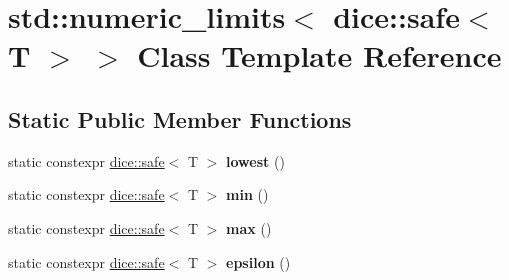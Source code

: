 \hypertarget{classstd_1_1numeric__limits_3_01dice_1_1safe_3_01T_01_4_01_4}{}\section{std\+:\+:numeric\+\_\+limits$<$ dice\+:\+:safe$<$ T $>$ $>$ Class Template Reference}
\label{classstd_1_1numeric__limits_3_01dice_1_1safe_3_01T_01_4_01_4}
\subsection*{Static Public Member Functions}
\begin{DoxyCompactItemize}
\item 
\mbox{\label{classstd_1_1numeric__limits_3_01dice_1_1safe_3_01T_01_4_01_4_a97cfb8c3de73ffd4df9b5220e8b9475c}} 
static constexpr \mbox{\hyperlink{safe_8hpp_acd796e346e2b746739435c4a2983edba}{dice\+::safe}}$<$ T $>$ {\bfseries lowest} ()
\item 
\mbox{\label{classstd_1_1numeric__limits_3_01dice_1_1safe_3_01T_01_4_01_4_a6e2df63214d969fe081684f30e853906}} 
static constexpr \mbox{\hyperlink{safe_8hpp_acd796e346e2b746739435c4a2983edba}{dice\+::safe}}$<$ T $>$ {\bfseries min} ()
\item 
\mbox{\label{classstd_1_1numeric__limits_3_01dice_1_1safe_3_01T_01_4_01_4_a7aa0e628742910d99c2638068b24d194}} 
static constexpr \mbox{\hyperlink{safe_8hpp_acd796e346e2b746739435c4a2983edba}{dice\+::safe}}$<$ T $>$ {\bfseries max} ()
\item 
\mbox{\label{classstd_1_1numeric__limits_3_01dice_1_1safe_3_01T_01_4_01_4_a9813a0ef58e72d30557426f38e3686e7}} 
static constexpr \mbox{\hyperlink{safe_8hpp_acd796e346e2b746739435c4a2983edba}{dice\+::safe}}$<$ T $>$ {\bfseries epsilon} ()
\item 
\mbox{\label{classstd_1_1numeric__limits_3_01dice_1_1safe_3_01T_01_4_01_4_a094f8771a105ddc4ab7da6ce6701c915}} 

\end{DoxyCompactItemize}

